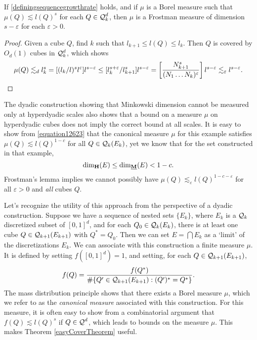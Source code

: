 \begin{theorem} \label{easyCoverTheorem}
	If \eqref{definingsequencegrowthrate} holds, and if $\mu$ is a Borel measure such that $\mu(Q) \lesssim l(Q)^s$ for each $Q \in \operatorname{\mathcal{Q}}_k^d$, then $\mu$ is a Frostman measure of dimension $s - \varepsilon$ for each $\varepsilon > 0$.
\end{theorem}
\begin{proof}
	Given a cube $Q$, find $k$ such that $l_{k+1} \leq l(Q) \leq l_k$. Then $Q$ is covered by $O_d(1)$ cubes in $\operatorname{\mathcal{Q}}^d_k$, which shows
	\[ \mu(Q) \lesssim_d l_k^s = [(l_k/l)^s l^\varepsilon ] l^{s - \varepsilon} \leq [l_k^{s + \varepsilon} / l_{k+1}^s] l^{s - \varepsilon} = \left[ \frac{N_{k+1}^s}{(N_1 \dots N_k)^\varepsilon} \right] l^{s-\varepsilon} \lesssim_\varepsilon l^{s-\varepsilon}. \qedhere \]
\end{proof}	

\begin{remark}
	The dyadic construction showing that Minkowski dimension cannot be measured only at hyperdyadic scales also shows that a bound on a measure $\mu$ on hyperdyadic cubes does not imply the correct bound at all scales. It is easy to show from \eqref{equation12623} that the canonical measure $\mu$ for this example satisfies $\mu(Q) \lesssim l(Q)^{1-c}$ for all $Q \in \operatorname{\mathcal{Q}}_k(E_k)$, yet we know that for the set constructed in that example,
	\[ \operatorname{\dim_{\mathbf{H}}}(E) \leq \operatorname{\dim_{\underline{\mathbf{M}}}}(E) < 1 - c. \]
	Frostman's lemma implies we cannot possibly have $\mu(Q) \lesssim_\varepsilon l(Q)^{1-c-\varepsilon}$ for all $\varepsilon > 0$ and \emph{all} cubes $Q$.
\end{remark}

Let's recognize the utility of this approach from the perspective of a dyadic construction. Suppose we have a sequence of nested sets $\{ E_k \}$, where $E_k$ is a $\operatorname{\mathcal{Q}}_k$ discretized subset of $[0,1]^d$, and for each $Q_0 \in \operatorname{\mathcal{Q}}_k(E_k)$, there is at least one cube $Q \in \operatorname{\mathcal{Q}}_{k+1}(E_{k+1})$ with $Q^* = Q_0$. Then we can set $E = \bigcap E_k$ as a `limit' of the discretizations $E_k$. We can associate with this construction a finite measure $\mu$. It is defined by setting $f([0,1]^d) = 1$, and setting, for each $Q \in \operatorname{\mathcal{Q}}_{k+1}(E_{k+1})$,
%
\[ f(Q) = \frac{f(Q^*)}{\# \{ Q' \in \operatorname{\mathcal{Q}}_{k+1}(E_{k+1}) : (Q')^* = Q^* \}}. \]
%
The mass distribution principle shows that there exists a Borel measure $\mu$, which we refer to as the \emph{canonical measure} associated with this construction. For this measure, it is often easy to show from a combinatorial argument that $f(Q) \lesssim l(Q)^s$ if $Q \in \operatorname{\mathcal{Q}}^d$, which leads to bounds on the measure $\mu$. This makes Theorem \ref{easyCoverTheorem} useful.

